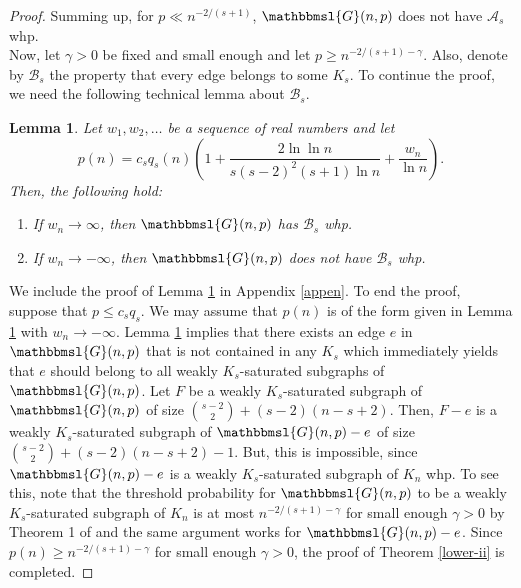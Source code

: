 \documentclass[hidelinks, 11pt]{article}
\theoremstyle{plain}
\newtheorem{lemma}[theorem]{Lemma}
\theoremstyle{definition}
\begin{document}
\begin{proof}
Summing up, for $p\ll n^{-2/(s+1)}$,   $\mathbbmsl{G}(n,p)$ does not have $\mathcal{A}_s$ whp.\\

Now, let $\gamma>0$ be fixed and small enough  and  let $p\geq n^{-2/(s+1)-\gamma}$. Also, denote  by $\mathcal{B}_s$ the property  that every edge belongs to some $K_s$. To continue  the proof, we need the following technical lemma about $\mathcal{B}_s$.



\begin{lemma}\label{edge_in_clique}
Let $w_1, w_2, \ldots$ be a sequence of real numbers  and let
$$p(n)=c_sq_s(n)\left(1+\frac{2\ln\ln n}{s(s-2)^2(s+1)\ln n}+\frac{w_n}{\ln n}\right).$$
Then, the  following hold:
\begin{enumerate}
\item[{\rm (i)}] If $w_n\to\infty$, then   $\mathbbmsl{G}(n,p)$ has $\mathcal{B}_s$ whp.
\item[{\rm (ii)}] If $w_n\to-\infty$, then   $\mathbbmsl{G}(n,p)$ does not have $\mathcal{B}_s$ whp.
\end{enumerate}
\end{lemma}



We include the proof of Lemma \ref{edge_in_clique}  in Appendix   \ref{appen}. To end the proof,  suppose  that  $p\leq c_sq_s$.
We may assume that  $p(n)$ is of the form   given  in Lemma \ref{edge_in_clique} with  $w_n\to-\infty$.  Lemma  \ref{edge_in_clique} implies that  there exists an edge $e$ in $\mathbbmsl{G}(n, p)$ that is not contained in any $K_s$ which   immediately yields  that $e$ should belong to all   weakly $K_s$-saturated subgraphs of  $\mathbbmsl{G}(n, p)$. Let  $F$ be  a weakly $K_s$-saturated subgraph of $\mathbbmsl{G}(n,p)$ of size ${s-2 \choose 2}+(s-2)(n-s+2)$. Then,  $F-e$  is a weakly $K_s$-saturated subgraph of  $\mathbbmsl{G}(n,p)-e$ of size    ${s-2 \choose 2}+(s-2)(n-s+2)-1$. But, this is impossible,  since   $\mathbbmsl{G}(n, p)-e$ is a  weakly $K_s$-saturated subgraph of  $K_n$ whp. To see this,    note that  the threshold probability  for $\mathbbmsl{G}(n, p)$ to be a  weakly $K_s$-saturated subgraph of  $K_n$ is at most $n^{-2/(s+1)-\gamma}$ for small enough $\gamma>0$ by Theorem 1 of  \cite{bal} and the same argument works for $\mathbbmsl{G}(n,p)-e$. Since $p(n)\geq n^{-2/(s+1)-\gamma}$ for small enough $\gamma>0$, the proof of Theorem \ref{lower-ii} is completed.
\end{proof}
\end{document}
